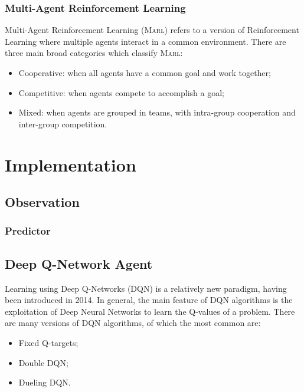 \documentclass[a4paper, 12pt]{article}
\numberwithin{equation}{section}
\begin{document}
\subsubsection{Multi-Agent Reinforcement Learning}

Multi-Agent Reinforcement Learning (\textsc{Marl}) \cite{multi-agent-rl} refers to a version of Reinforcement Learning where multiple agents interact in a common environment. There are three main broad categories which classify \textsc{Marl}:
\begin{itemize}
	\item Cooperative: when all agents have a common goal and work together;
	\item Competitive: when agents compete to accomplish a goal;
	\item Mixed: when agents are grouped in teams, with intra-group cooperation and inter-group competition.
\end{itemize}



\section{Implementation}


\subsection{Observation}

\subsubsection{Predictor}


\subsection{Deep Q-Network Agent}

Learning using Deep Q-Networks (DQN) \cite{improvements} is a relatively new paradigm, having been introduced in 2014. In general, the main feature of DQN algorithms is the exploitation of Deep Neural Networks to learn the Q-values of a problem. There are many versions of DQN algorithms, of which the most common are:
\begin{itemize}
	\item Fixed Q-targets;
	\item Double DQN;
	\item Dueling DQN.
\end{itemize}
\end{document}
